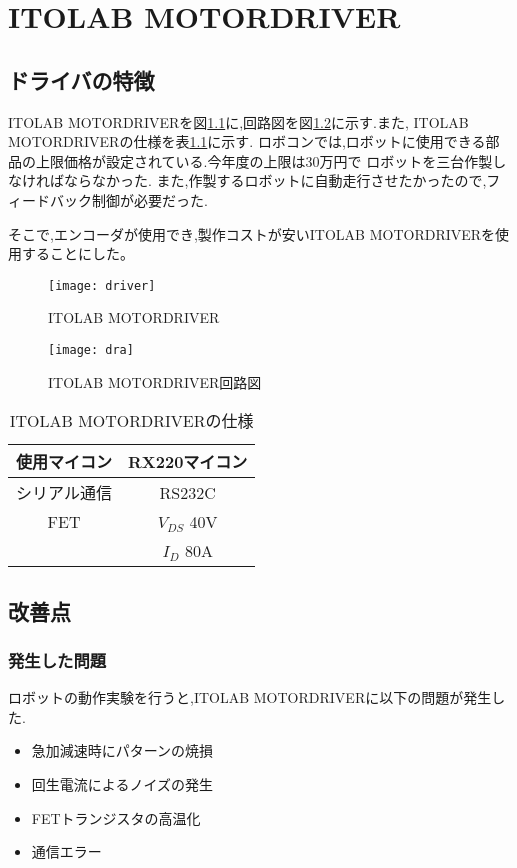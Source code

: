 \chapter{ITOLAB MOTORDRIVER}

\section{ドライバの特徴}
ITOLAB MOTORDRIVERを図\ref{fig:driver}に,回路図を図\ref{fig:dra}に示す.また,
ITOLAB MOTORDRIVERの仕様を表\ref{tab:shiyou}に示す.
ロボコンでは,ロボットに使用できる部品の上限価格が設定されている.今年度の上限は30万円で
ロボットを三台作製しなければならなかった.
また,作製するロボットに自動走行させたかったので,フィードバック制御が必要だった.

そこで,エンコーダが使用でき,製作コストが安いITOLAB MOTORDRIVERを使用することにした。

\begin{figure}[H]
  \begin{center}
    \texttt{[image: driver]}
    \end{center}
  \caption{ITOLAB MOTORDRIVER}
 \label{fig:driver}
\end{figure}
\begin{figure}[H]
  \begin{center}
    \texttt{[image: dra]}
    \end{center}
  \caption{ITOLAB MOTORDRIVER回路図}
 \label{fig:dra}
\end{figure}
\begin{table}[htb]
\centering
\caption{ITOLAB MOTORDRIVERの仕様}
\begin{tabular}{|c|c|} \hline
使用マイコン&RX220マイコン\\ \hline
シリアル通信&RS232C\\ \hline
FET&$V_{DS}$  40V\\
   &$I_D$  80A\\ \hline
\end{tabular}
\label{tab:shiyou}
\end{table}

\section{改善点}
\subsection{発生した問題}
ロボットの動作実験を行うと,ITOLAB MOTORDRIVERに以下の問題が発生した.
\begin{itemize}
\item 急加減速時にパターンの焼損
\item 回生電流によるノイズの発生
\item FETトランジスタの高温化
\item 通信エラー
\end{itemize}
